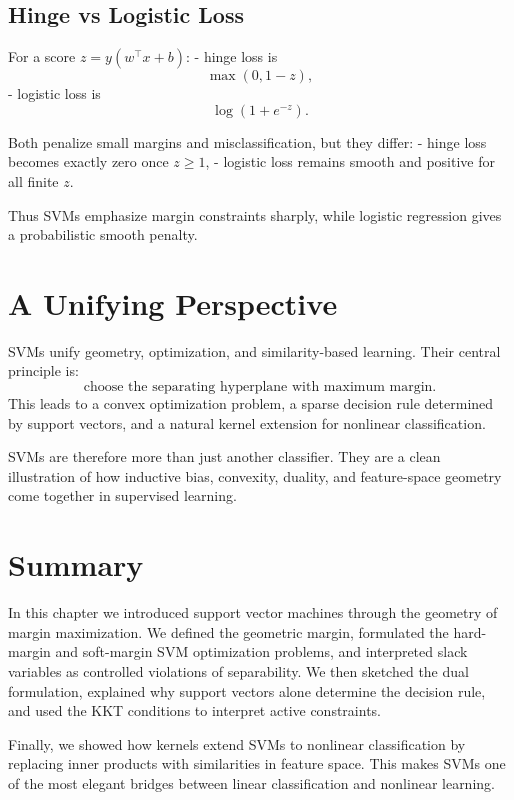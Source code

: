 \subsection{Hinge vs Logistic Loss}

For a score $z=y(w^\top x+b)$:
- hinge loss is
\[
\max(0,1-z),
\]
- logistic loss is
\[
\log(1+e^{-z}).
\]

Both penalize small margins and misclassification, but they differ:
- hinge loss becomes exactly zero once $z\ge 1$,
- logistic loss remains smooth and positive for all finite $z$.

Thus SVMs emphasize margin constraints sharply, while logistic regression gives a probabilistic smooth penalty.

\section{A Unifying Perspective}

SVMs unify geometry, optimization, and similarity-based learning. Their central principle is:
\[
\text{choose the separating hyperplane with maximum margin.}
\]
This leads to a convex optimization problem, a sparse decision rule determined by support vectors, and a natural kernel extension for nonlinear classification.

SVMs are therefore more than just another classifier. They are a clean illustration of how inductive bias, convexity, duality, and feature-space geometry come together in supervised learning.

\section{Summary}

In this chapter we introduced support vector machines through the geometry of margin maximization. We defined the geometric margin, formulated the hard-margin and soft-margin SVM optimization problems, and interpreted slack variables as controlled violations of separability. We then sketched the dual formulation, explained why support vectors alone determine the decision rule, and used the KKT conditions to interpret active constraints.

Finally, we showed how kernels extend SVMs to nonlinear classification by replacing inner products with similarities in feature space. This makes SVMs one of the most elegant bridges between linear classification and nonlinear learning.